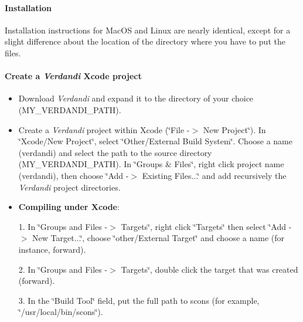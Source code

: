 \documentclass{tufte-book}
\begin{document}
\hypertarget{installation_installation_macos}{}\paragraph{\-Installation}\label{installation_installation_macos}

\-Installation instructions for \-Mac\-O\-S and \-Linux are nearly identical, except for a slight difference about the location of the directory where you have to put the files.

\hypertarget{installation_Xcodeproject}{}\paragraph{\-Create a \emph{Verdandi} Xcode project}\label{installation_Xcodeproject}

\begin{itemize}
\item \-Download \-\emph{Verdandi} and expand it to the directory of your choice ({\ttfamily \-M\-Y\-\_\-\-V\-E\-R\-D\-A\-N\-D\-I\-\_\-\-P\-A\-T\-H}).


\item \-Create a \-\emph{Verdandi} project within \-Xcode (\char`\"{}\-File -\/$>$ New Project\char`\"{}). \-In \char`\"{}\-Xcode/\-New Project\char`\"{}, select \char`\"{}\-Other/\-External Build System\char`\"{}. \-Choose a name ({\ttfamily verdandi}) and select the path to the source directory ({\ttfamily \-M\-Y\-\_\-\-V\-E\-R\-D\-A\-N\-D\-I\-\_\-\-P\-A\-T\-H}). \-In \char`\"{}\-Groups \& Files\char`\"{}, right click project name ({\ttfamily verdandi}), then choose \char`\"{}\-Add -\/$>$ Existing Files...\char`\"{} and add recursively the \-\emph{Verdandi} project directories.
\item {\bfseries \-Compiling under \-Xcode}\-: \par


1. \-In \char`\"{}\-Groups and Files -\/$>$ Targets\char`\"{}, right click \char`\"{}\-Targets\char`\"{} then select \char`\"{}\-Add -\/$>$ New Target...\char`\"{}, choose \char`\"{}other/\-External Target\char`\"{} and choose a name (for instance, {\ttfamily forward}).

2. \-In \char`\"{}\-Groups and Files -\/$>$ Targets\char`\"{}, double click the target that was created ({\ttfamily forward}).

3. \-In the \char`\"{}\-Build Tool\char`\"{} field, put the full path to scons (for example, \char`\"{}/usr/local/bin/scons\char`\"{}).


\end{itemize}
\end{document}
